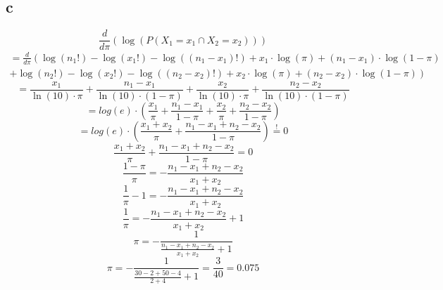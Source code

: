 \subsection{c}
\[ \frac{d}{d\pi}\left(\log(P(X_1=x_1 \cap X_2 = x_2))\right) \]
\[ \begin{array}{l} 
= \frac{d}{d\pi}\left( 
\log(n_1!) 
- \log(x_1!) 
- \log((n_1 - x_1)!) 
+ x_1 \cdot \log(\pi) 
+ (n_1 - x_1) \cdot \log(1-\pi) \right.\\\left.
+ \log(n_2!) 
- \log(x_2!) 
- \log((n_2 - x_2)!) 
+ x_2 \cdot \log(\pi) 
+ (n_2 - x_2) \cdot \log(1-\pi) \right)
\end{array} \]
%
\[ = \frac{x_1}{\ln(10) \cdot \pi} + \frac{n_1 - x_1}{\ln(10) \cdot (1 - \pi)}
+ \frac{x_2}{\ln(10) \cdot \pi} + \frac{n_2 - x_2}{\ln(10) \cdot (1 - \pi)} \]
\[ = log(e) \cdot \left( 
\frac{x_1}{\pi} 
+ \frac{n_1 - x_1}{1 - \pi}
+ \frac{x_2}{\pi} 
+ \frac{n_2 - x_2}{1 - \pi} \right) \]
\[ = log(e) \cdot \left( 
\frac{x_1 + x_2}{\pi} 
+ \frac{n_1 - x_1 + n_2 - x_2}{1 - \pi} \right) \stackrel{!}{=} 0 \]
\[ \frac{x_1 + x_2}{\pi} + \frac{n_1 - x_1 + n_2 - x_2}{1 - \pi} = 0 \]
\[ \frac{1 - \pi}{\pi} = - \frac{n_1 - x_1 + n_2 - x_2}{x_1 + x_2} \]
\[ \frac{1}{\pi} -1 = - \frac{n_1 - x_1 + n_2 - x_2}{x_1 + x_2} \]
\[ \frac{1}{\pi} = - \frac{n_1 - x_1 + n_2 - x_2}{x_1 + x_2} + 1 \]
\[ \pi = -\frac{1}{\frac{n_1 - x_1 + n_2 - x_2}{x_1 + x_2} + 1} \]
\[ \pi = -\frac{1}{\frac{30 - 2 + 50 - 4}{2 + 4} + 1} = \frac{3}{40} = 0.075 \]



































